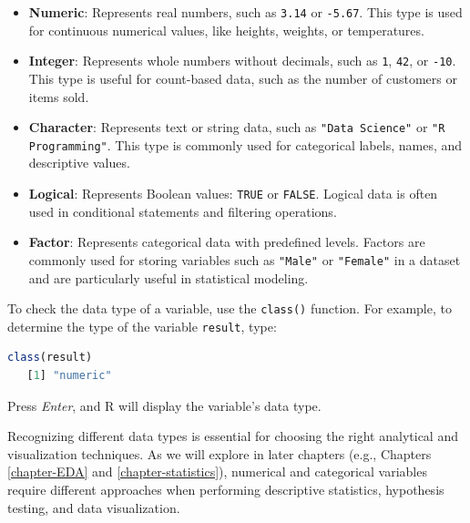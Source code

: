 \documentclass[
]{book}
\newcommand{\passthrough}[1]{#1}
\providecommand{\tightlist}{%
  \setlength{\itemsep}{0pt}\setlength{\parskip}{0pt}}
\theoremstyle{definition}
\theoremstyle{definition}
\theoremstyle{definition}
\theoremstyle{definition}
\theoremstyle{remark}
\begin{document}
\begin{itemize}
\tightlist
\item
  \textbf{Numeric}: Represents real numbers, such as \passthrough{\lstinline!3.14!} or \passthrough{\lstinline!-5.67!}. This type is used for continuous numerical values, like heights, weights, or temperatures.\\
\item
  \textbf{Integer}: Represents whole numbers without decimals, such as \passthrough{\lstinline!1!}, \passthrough{\lstinline!42!}, or \passthrough{\lstinline!-10!}. This type is useful for count-based data, such as the number of customers or items sold.\\
\item
  \textbf{Character}: Represents text or string data, such as \passthrough{\lstinline!"Data Science"!} or \passthrough{\lstinline!"R Programming"!}. This type is commonly used for categorical labels, names, and descriptive values.\\
\item
  \textbf{Logical}: Represents Boolean values: \passthrough{\lstinline!TRUE!} or \passthrough{\lstinline!FALSE!}. Logical data is often used in conditional statements and filtering operations.\\
\item
  \textbf{Factor}: Represents categorical data with predefined levels. Factors are commonly used for storing variables such as \passthrough{\lstinline!"Male"!} or \passthrough{\lstinline!"Female"!} in a dataset and are particularly useful in statistical modeling.
\end{itemize}

To check the data type of a variable, use the \passthrough{\lstinline!class()!} function. For example, to determine the type of the variable \passthrough{\lstinline!result!}, type:

\begin{lstlisting}[language=R]
class(result)
   [1] "numeric"
\end{lstlisting}

Press \emph{Enter}, and R will display the variable's data type.

Recognizing different data types is essential for choosing the right analytical and visualization techniques. As we will explore in later chapters (e.g., Chapters \ref{chapter-EDA} and \ref{chapter-statistics}), numerical and categorical variables require different approaches when performing descriptive statistics, hypothesis testing, and data visualization.
\end{document}
